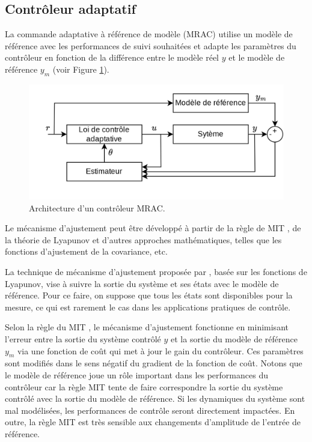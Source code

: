 \subsection*{Contrôleur adaptatif}

La commande adaptative à référence de modèle (MRAC) utilise un modèle de référence avec les performances de suivi souhaitées et adapte les paramètres du contrôleur en fonction de la différence entre le modèle réel $y$ et le modèle de référence $y_{m}$ (voir Figure \ref{fig:schemaMRAC}). 

\begin{figure}[ht!]
    \centerline{
    \includegraphics[trim=0cm 0cm 0cm 0cm,clip,width=0.5\columnwidth]{figures/Mrac.png}}
    \caption{Architecture d'un contrôleur MRAC.}
    \label{fig:schemaMRAC}
\end{figure}


Le mécanisme d'ajustement peut être développé à partir de la règle de MIT \cite{Jain2013DesignOA}, de la théorie de Lyapunov \cite{GE1999741, CHAKRABARTY2016213} et d'autres approches mathématiques, telles que les fonctions d'ajustement de la covariance, etc. 

La technique de mécanisme d'ajustement proposée par \cite{CHAKRABARTY2016213}, basée sur les fonctions de Lyapunov, vise à suivre la sortie du système et ses états avec le modèle de référence. Pour ce faire, on suppose que tous les états sont disponibles pour la mesure, ce qui est rarement le cas dans les applications pratiques de contrôle.

Selon la règle du MIT \cite{Shekhar2018}, le mécanisme d'ajustement fonctionne en minimisant l'erreur entre la sortie du système contrôlé $y$ et la sortie du modèle de référence $y_{m}$ via une fonction de coût qui met à jour le gain du contrôleur. Ces paramètres sont modifiés dans le sens négatif du gradient de la fonction de coût. Notons que le modèle de référence joue un rôle important dans les performances du contrôleur car la règle MIT tente de faire correspondre la sortie du système contrôlé avec la sortie du modèle de référence. Si les dynamiques du système sont mal modélisées, les performances de contrôle seront directement impactées.
En outre, la règle MIT est très sensible aux changements d'amplitude de l'entrée de référence.

